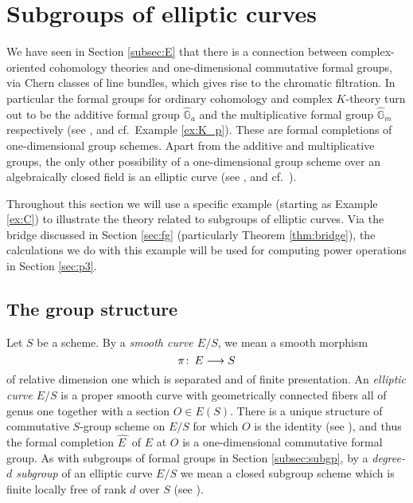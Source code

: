 \documentclass{gtpart}
\theoremstyle{definition}
\theoremstyle{remark}
\def\co{\colon\thinspace}
\newcommand{\mb}[1]{\mathbb{#1}}
\newcommand{\HGa}{{\widehat{\mb G}_a}}
\newcommand{\HGm}{{\widehat{\mb G}_m}}
\newcommand{\HE}{\widehat{E~}\!}
\numberwithin{equation}{section}
\numberwithin{thm}{section}
\begin{document}
\section{Subgroups of elliptic curves}
\label{sec:ec}

We have seen in Section \ref{subsec:E} that there is a connection 
between complex-oriented cohomology theories and one-dimensional 
commutative formal groups, via Chern classes of line bundles, which 
gives rise to the chromatic filtration.  In particular the formal groups 
for ordinary cohomology and complex $K$-theory turn out to be the 
additive formal group $\HGa$ and the multiplicative formal group $\HGm$ 
respectively (see \cite[Example 2.14, and Sections 1 and 7]{coctalos}, 
and cf.~Example \ref{ex:K_p}).  These are formal completions of 
one-dimensional group schemes.  Apart from the additive and 
multiplicative groups, the only other possibility of a one-dimensional 
group scheme over an algebraically closed field is an elliptic curve 
(see \cite[IV.1.6]{AECII}, and cf.~\cite[Section 12]{tafoverview}).  

Throughout this section we will use a specific example (starting as 
Example \ref{ex:C}) to illustrate the theory related to subgroups of 
elliptic curves.  Via the bridge discussed in Section \ref{sec:fg} 
(particularly Theorem \ref{thm:bridge}), the calculations we do with 
this example will be used for computing power operations in Section 
\ref{sec:p3}.  


\subsection{The group structure}
\label{subsec:gp}

Let $S$ be a scheme.  By a {\em smooth curve $E/S$}, we mean a smooth 
morphism 
\[
 \pi \co E \longrightarrow S 
\]
of relative dimension one which is separated and of finite presentation.  
An {\em elliptic curve $E/S$} is a proper smooth curve with 
geometrically connected fibers all of genus one together with a section 
$O \in E(S)$.  There is a unique structure of commutative $S$-group 
scheme on $E/S$ for which $O$ is the identity (see 
\cite[2.1.2 and 2.5.1]{KM}), and thus the formal completion $\HE$ of $E$ 
at $O$ is a one-dimensional commutative formal group.  As with subgroups 
of formal groups in Section \ref{subsec:subgp}, by a {\em degree-$d$ 
subgroup} of an elliptic curve $E/S$ we mean a closed subgroup scheme 
which is finite locally free of rank $d$ over $S$ (see \cite[1.2]{KM}).  
\end{document}
